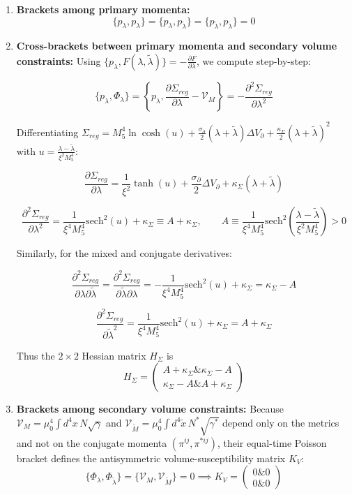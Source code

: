 \documentclass[aps,prd,onecolumn,superscriptaddress,nofootinbib,longbibliography,10pt]{revtex4-2}
\begin{document}
{{  
\begin{enumerate}
    
\item \textbf{Brackets among primary momenta:}
    \[ \{p_\lambda, p_\lambda\} = \{p_\lambda, p_{\tilde{\lambda}}\} = \{p_{\tilde{\lambda}}, p_{\tilde{\lambda}}\} = 0 \]
    
\item \textbf{Cross-brackets between primary momenta and secondary volume constraints:} Using \(\{p_\lambda, F(\lambda,\tilde{\lambda})\} = -\frac{\partial F}{\partial\lambda}\), we compute step-by-step:


\[\{p_\lambda, \Phi_\lambda\} = \left\{ p_\lambda, \frac{\partial\Sigma_{reg}}{\partial\lambda} - \mathcal{V}_M \right\} = -\frac{\partial^2\Sigma_{reg}}{\partial\lambda^2}\]


Differentiating \(\Sigma_{reg} = M_5^4\ln\cosh(u) + \frac{\sigma_\partial}{2}(\lambda + \tilde{\lambda})\Delta V_\partial + \frac{\kappa_\Sigma}{2}(\lambda + \tilde{\lambda})^2\) with \(u = \frac{\lambda - \tilde{\lambda}}{\xi^2 M_5^4}\):


\[\frac{\partial\Sigma_{reg}}{\partial\lambda} = \frac{1}{\xi^2}\tanh(u) + \frac{\sigma_\partial}{2}\Delta V_\partial + \kappa_\Sigma(\lambda + \tilde{\lambda})\]


\[\frac{\partial^2\Sigma_{reg}}{\partial\lambda^2} = \frac{1}{\xi^4 M_5^4}\text{sech}^2(u) + \kappa_\Sigma \equiv A + \kappa_\Sigma, \qquad A \equiv \frac{1}{\xi^4 M_5^4}\text{sech}^2\left(\frac{\lambda - \tilde{\lambda}}{\xi^2 M_5^4}\right) > 0\]


Similarly, for the mixed and conjugate derivatives:


\[\frac{\partial^2\Sigma_{reg}}{\partial\lambda\partial\tilde{\lambda}} = \frac{\partial^2\Sigma_{reg}}{\partial\tilde{\lambda}\partial\lambda} = -\frac{1}{\xi^4 M_5^4}\text{sech}^2(u) + \kappa_\Sigma = \kappa_\Sigma - A\]


\[\frac{\partial^2\Sigma_{reg}}{\partial\tilde{\lambda}^2} = \frac{1}{\xi^4 M_5^4}\text{sech}^2(u) + \kappa_\Sigma = A + \kappa_\Sigma\]


Thus the \(2 \times 2\) Hessian matrix \(H_\Sigma\) is
    \[ H_\Sigma = \begin{pmatrix} A + \kappa_\Sigma \& \kappa_\Sigma - A \\ \kappa_\Sigma - A \& A + \kappa_\Sigma \end{pmatrix} \]
    
\item \textbf{Brackets among secondary volume constraints:} Because \(\mathcal{V}_M = \mu_0^4\int d^4x\,N\sqrt{\gamma}\) and \(\mathcal{V}_{\tilde{M}} = \mu_0^4\int d^4\tilde{x}\,N^*\sqrt{\gamma^*}\) depend only on the metrics and not on the conjugate momenta \((\pi^{ij}, \pi^{*ij})\), their equal-time Poisson bracket defines the antisymmetric volume-susceptibility matrix \(K_V\):
    \[ \{\Phi_\lambda, \Phi_{\tilde{\lambda}}\} = \{\mathcal{V}_M, \mathcal{V}_{\tilde{M}}\} = 0 \implies K_V = \begin{pmatrix} 0 \& 0 \\ 0 \& 0 \end{pmatrix} \]
  

\end{enumerate}}}
\end{document}
